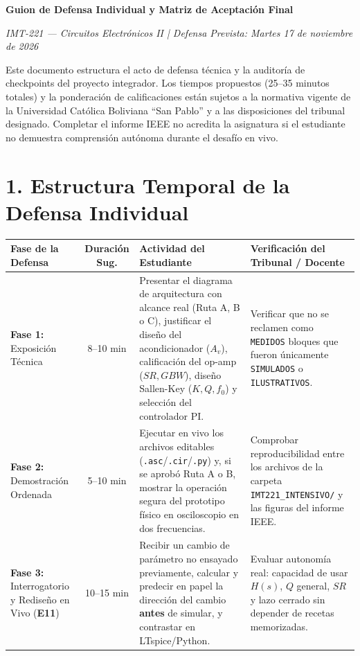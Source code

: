 \documentclass[11pt, a4paper]{article}
\begin{document}
\begin{center}
    {\Large \textbf{Guion de Defensa Individual y Matriz de Aceptación Final}}
    \par\vspace{0.15cm}
    \textit{IMT-221 — Circuitos Electrónicos II | Defensa Prevista: Martes 17 de noviembre de 2026}
\end{center}

\begin{tcolorbox}[colback=ucbblue!5, colframe=ucbblue, title=\textbf{Nota Institucional sobre la Evaluación Final}]
    Este documento estructura el acto de defensa técnica y la auditoría de checkpoints del proyecto integrador. Los tiempos propuestos (25--35 minutos totales) y la ponderación de calificaciones están sujetos a la normativa vigente de la Universidad Católica Boliviana ``San Pablo'' y a las disposiciones del tribunal designado. Completar el informe IEEE no acredita la asignatura si el estudiante no demuestra comprensión autónoma durante el desafío en vivo.
\end{tcolorbox}

\section*{1. Estructura Temporal de la Defensa Individual}

\begin{center}
\begin{tabularx}{\textwidth}{@{} l c L L @{}}
\toprule
\textbf{Fase de la Defensa} & \textbf{Duración Sug.} & \textbf{Actividad del Estudiante} & \textbf{Verificación del Tribunal / Docente} \\ \midrule
\textbf{Fase 1:} Exposición Técnica & 8--10 min & Presentar el diagrama de arquitectura con alcance real (Ruta A, B o C), justificar el diseño del acondicionador ($A_v$), calificación del op-amp ($SR, GBW$), diseño Sallen-Key ($K, Q, f_0$) y selección del controlador PI. & Verificar que no se reclamen como \texttt{MEDIDOS} bloques que fueron únicamente \texttt{SIMULADOS} o \texttt{ILUSTRATIVOS}. \\ \addlinespace[5pt]
\textbf{Fase 2:} Demostración Ordenada & 5--10 min & Ejecutar en vivo los archivos editables (\texttt{.asc}/\texttt{.cir}/\texttt{.py}) y, si se aprobó Ruta A o B, mostrar la operación segura del prototipo físico en osciloscopio en dos frecuencias. & Comprobar reproducibilidad entre los archivos de la carpeta \texttt{IMT221\_INTENSIVO/} y las figuras del informe IEEE. \\ \addlinespace[5pt]
\textbf{Fase 3:} Interrogatorio y Rediseño en Vivo (\textbf{E11}) & 10--15 min & Recibir un cambio de parámetro no ensayado previamente, calcular y predecir en papel la dirección del cambio \textbf{antes} de simular, y contrastar en LTspice/Python. & Evaluar autonomía real: capacidad de usar $H(s)$, $Q$ general, $SR$ y lazo cerrado sin depender de recetas memorizadas. \\ \bottomrule
\end{tabularx}
\end{center}
\end{document}
